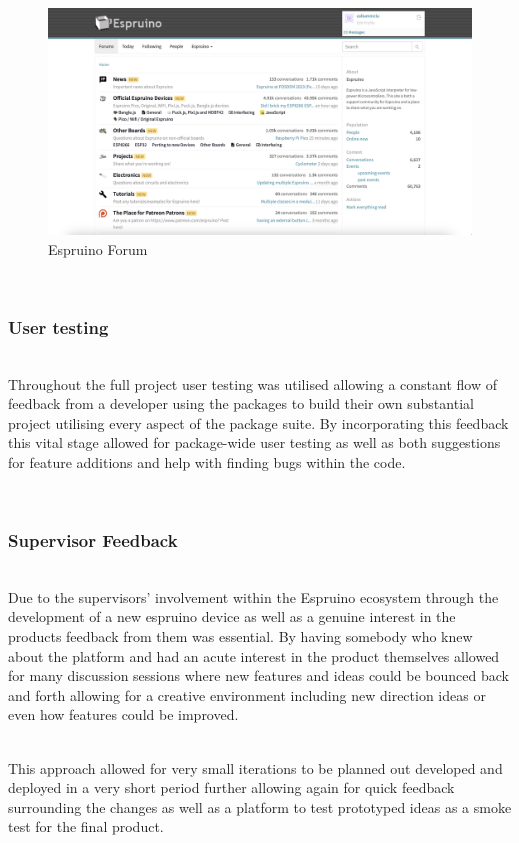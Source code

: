 \documentclass{l4proj}
\begin{document}
\begin{figure}[!ht]
    \centering
    \includegraphics[width=12cm]{dissertation/images/espruino-forum.png}
    \caption{Espruino Forum}
    \label{fig:espruino-forum}
\end{figure}

\text \\
\subsubsection{User testing}\hfill\\
Throughout the full project user testing was utilised allowing a constant flow of feedback from a developer using the packages to build their own substantial project utilising every aspect of the package suite. By incorporating this feedback this vital stage allowed for package-wide user testing as well as both suggestions for feature additions and help with finding bugs within the code.

\text \\
\subsubsection{Supervisor Feedback}\hfill\\
Due to the supervisors' involvement within the Espruino ecosystem through the development of a new espruino device as well as a genuine interest in the products feedback from them was essential. By having somebody who knew about the platform and had an acute interest in the product themselves allowed for many discussion sessions where new features and ideas could be bounced back and forth allowing for a creative environment including new direction ideas or even how features could be improved.

\text \\

This approach allowed for very small iterations to be planned out developed and deployed in a very short period further allowing again for quick feedback surrounding the changes as well as a platform to test prototyped ideas as a smoke test for the final product.
\end{document}
